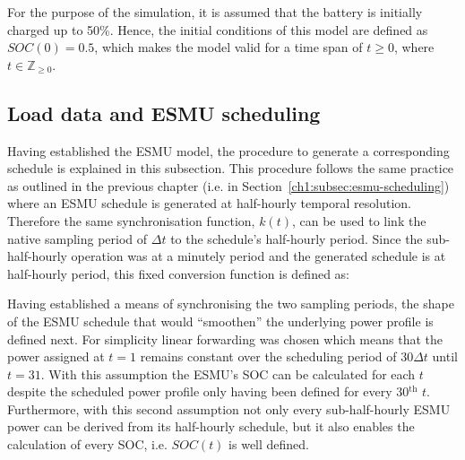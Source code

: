 For the purpose of the simulation, it is assumed that the battery is initially charged up to 50\%.
Hence, the initial conditions of this model are defined as $SOC(0) = 0.5$, which makes the model valid for a time span of $t \geq 0$, where $t \in \mathbb{Z}_{\geq0}$.

\subsection{Load data and ESMU scheduling}
\label{ch2:subsec:load-data-and-esmu-scheduling}


Having established the ESMU model, the procedure to generate a corresponding schedule is explained in this subsection.
This procedure follows the same practice as outlined in the previous chapter (i.e. in Section~\ref{ch1:subsec:esmu-scheduling}) where an ESMU schedule is generated at half-hourly temporal resolution.
Therefore the same synchronisation function, $k(t)$, can be used to link the native sampling period of $\Delta t$ to the schedule's half-hourly period.
Since the sub-half-hourly operation was at a minutely period and the generated schedule is at half-hourly period, this fixed conversion function is defined as:



Having established a means of synchronising the two sampling periods, the shape of the ESMU schedule that would ``smoothen'' the underlying power profile is defined next.
For simplicity linear forwarding was chosen which means that the power assigned at  $t=1$ remains constant over the scheduling period of $30\Delta t$ until $t=31$.
With this assumption the ESMU's SOC can be calculated for each $t$ despite the scheduled power profile only having been defined for every 30$^\text{th}$ $t$.
Furthermore, with this second assumption not only every sub-half-hourly ESMU power can be derived from its half-hourly schedule, but it also enables the calculation of every SOC, i.e. $SOC(t)$ is well defined.


